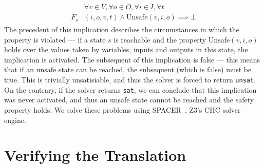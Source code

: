 \documentclass[acmsmall,screen,review]{acmart}
\begin{document}



\begin{align}
\begin{split}
    & \forall v\in V, \forall o\in O, \forall i\in I, \forall t\\
    F_s&(i,o,v,t) \land \text{Unsafe}(v, i, o) \implies \bot %
\end{split}
\end{align}
The precedent of this implication describes the circumstances in which the property is violated --- if a state $s$ is reachable and the property $\text{Unsafe}(v, i, o)$ holds over the values taken by variables, inputs and outputs in this state, the implication is activated.
The subsequent of this implication is false --- this means that if an unsafe state can be reached, the subsequent (which is false) must be true.
This is trivially unsatisiable, and thus the solver is forced to return \texttt{unsat}.
On the contrary, if the solver returns \texttt{sat}, we can conclude that this implication was never activated, and thus an unsafe state cannot be reached and the safety property holds.
We solve these problems using SPACER~\cite{spacer1,spacer2}, Z3's CHC solver engine.

\section{Verifying the Translation}
\label{sec:tv}
\end{document}
